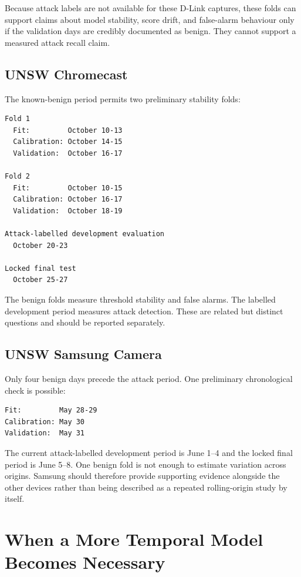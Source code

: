 \documentclass[11pt,a4paper]{article}
\begin{document}
Because attack labels are not available for these D-Link captures, these folds
can support claims about model stability, score drift, and false-alarm behaviour
only if the validation days are credibly documented as benign. They cannot
support a measured attack recall claim.

\subsection{UNSW Chromecast}

The known-benign period permits two preliminary stability folds:

\begin{verbatim}
Fold 1
  Fit:         October 10-13
  Calibration: October 14-15
  Validation:  October 16-17

Fold 2
  Fit:         October 10-15
  Calibration: October 16-17
  Validation:  October 18-19

Attack-labelled development evaluation
  October 20-23

Locked final test
  October 25-27
\end{verbatim}

The benign folds measure threshold stability and false alarms. The labelled
development period measures attack detection. These are related but distinct
questions and should be reported separately.

\subsection{UNSW Samsung Camera}

Only four benign days precede the attack period. One preliminary chronological
check is possible:

\begin{verbatim}
Fit:         May 28-29
Calibration: May 30
Validation:  May 31
\end{verbatim}

The current attack-labelled development period is June 1--4 and the locked
final period is June 5--8. One benign fold is not enough to estimate variation
across origins. Samsung should therefore provide supporting evidence alongside
the other devices rather than being described as a repeated rolling-origin
study by itself.

\section{When a More Temporal Model Becomes Necessary}
\end{document}
